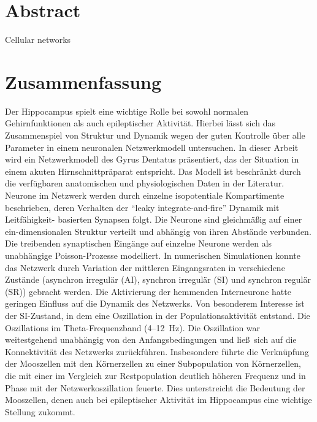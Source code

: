 \chapter*{Abstract}


Cellular networks 

\chapter*{Zusammenfassung}


Der Hippocampus spielt eine wichtige Rolle bei sowohl normalen Gehirnfunktionen
als auch epileptischer Aktivit\"at. Hierbei l\"asst sich das Zusammenspiel von  
Struktur und Dynamik wegen der guten Kontrolle \"uber alle Parameter
in einem neuronalen Netzwerkmodell untersuchen. 
In dieser Arbeit wird ein Netzwerkmodell des Gyrus Dentatus pr\"asentiert, das
der Situation in einem akuten Hirnschnittpr\"aparat entspricht. 
Das Modell ist beschr\"ankt durch die 
verf\"ugbaren anatomischen und physiologischen 
Daten in der Literatur. Neurone im Netzwerk werden durch einzelne 
isopotentiale Kompartimente beschrieben,
deren Verhalten der "`leaky integrate-and-fire"' Dynamik mit Leitf\"ahigkeit-%
basierten Synapsen
folgt. Die Neurone sind gleichm\"a\ss ig auf einer ein-dimensionalen 
Struktur verteilt und abh\"angig von ihren Abst\"ande verbunden. 
Die treibenden synaptischen Eing\"ange auf einzelne Neurone werden als unabh\"angige
Poisson-Prozesse modelliert.
In numerischen Simulationen konnte das Netzwerk durch Variation der mittleren
Eingangsraten in 
verschiedene Zust\"ande (asynchron irregul\"ar (AI), synchron irregul\"ar (SI) 
und synchron regul\"ar (SR)) gebracht werden.
Die Aktivierung der hemmenden Interneurone hatte
geringen Einfluss auf die Dynamik des Netzwerks. Von besonderem Interesse
ist der SI-Zustand, in dem eine Oszillation in der Populationsaktivit\"at entstand. 
Die Oszillations%
im Theta-Frequenzband 
(4--12~Hz). 
Die Oszillation war weitestgehend unabh\"angig von den Anfangsbedingungen
und lie\ss \ sich auf die Konnektivit\"at des Netzwerks 
zur\"uckf\"uhren. Insbesondere f\"uhrte die Verkn\"upfung der Mooszellen mit
den K\"ornerzellen zu einer Subpopulation von K\"ornerzellen, die mit einer
im Vergleich zur Restpopulation deutlich h\"oheren Frequenz und in Phase mit
der Netzwerkoszillation feuerte. Dies unterstreicht die Bedeutung der
Mooszellen, denen auch bei epileptischer Aktivit\"at im Hippocampus eine
wichtige Stellung zukommt.



